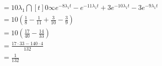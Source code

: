 \begin{enumerate}[(1)]
\begin{align*}
            &= 10\lambda_1 \dint[t]{0}{\infty}{e^{-8\lambda_1 t} - e^{-11\lambda_1 t} + 3e^{-10\lambda_1 t} - 3e^{-9\lambda_1 t}}\\
            &= 10\left(\frac{1}{8} - \frac{1}{11} + \frac{3}{10} - \frac{3}{9}\right)\\
            &= 10\left(\frac{17}{40} - \frac{14}{33}\right)\\
            &= \frac{17\cdot 33 - 140 \cdot 4}{132}\\
            &= \frac{1}{132}
        \end{align*}
\end{enumerate}